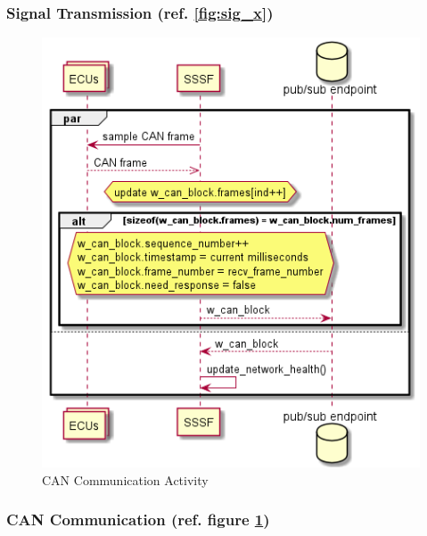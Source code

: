 \documentclass[letterpaper,twocolumn,12pt]{article}
\begin{document}
\subsubsection{Signal Transmission (ref. \ref{fig:sig_x})} \label{sec:sig_x}

\begin{figure}[t!]
    \centering
    \includegraphics[scale=0.8]{out/images/can_exchange/can_exchange.png}
    \caption{CAN Communication Activity}
    \label{fig:can_x}
\end{figure}
\subsubsection{CAN Communication (ref. figure \ref{fig:can_x})}
\end{document}
